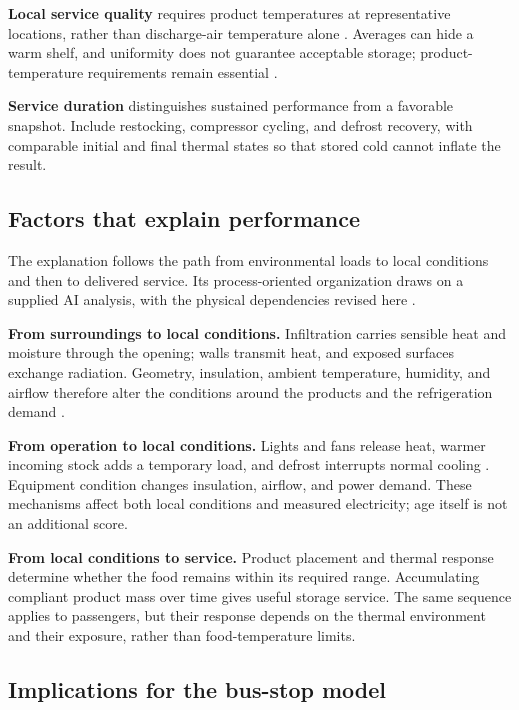 \documentclass[12pt]{article}
\begin{document}
\textbf{Local service quality} requires product temperatures at representative locations, rather than discharge-air temperature alone \cite{ashrae}. Averages can hide a warm shelf, and uniformity does not guarantee acceptable storage; product-temperature requirements remain essential \cite{etl}.

\textbf{Service duration} distinguishes sustained performance from a favorable snapshot. Include restocking, compressor cycling, and defrost recovery, with comparable initial and final thermal states so that stored cold cannot inflate the result.


\subsection{Factors that explain performance}

The explanation follows the path from environmental loads to local conditions and then to delivered service. Its process-oriented organization draws on a supplied AI analysis, with the physical dependencies revised here \cite{gemini}.

\noindent\textbf{From surroundings to local conditions.} Infiltration carries sensible heat and moisture through the opening; walls transmit heat, and exposed surfaces exchange radiation. Geometry, insulation, ambient temperature, humidity, and airflow therefore alter the conditions around the products and the refrigeration demand \cite{ashrae}.

\noindent\textbf{From operation to local conditions.} Lights and fans release heat, warmer incoming stock adds a temporary load, and defrost interrupts normal cooling \cite{ashrae}. Equipment condition changes insulation, airflow, and power demand. These mechanisms affect both local conditions and measured electricity; age itself is not an additional score.

\noindent\textbf{From local conditions to service.} Product placement and thermal response determine whether the food remains within its required range. Accumulating compliant product mass over time gives useful storage service. The same sequence applies to passengers, but their response depends on the thermal environment and their exposure, rather than food-temperature limits.

\subsection{Implications for the bus-stop model}
\end{document}
